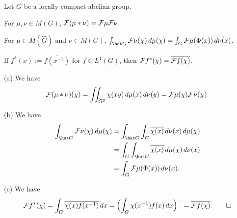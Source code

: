 \documentclass{../../small}
\begin{document}
\begin{prop}
Let $G$ be a locally compact abelian group.
\begin{parts}
\item For $\mu,\nu\in M(G)$, $\mathcal{F}(\mu*\nu)=\mathcal{F}\mu\mathcal{F}\nu$.
\item For $\mu\in M(\hat G)$ and $\nu\in M(G)$, $\int_{\hat G}\cF \nu(\chi)\,d\mu(\chi)=\int_G\cF\mu(\Phi(x))\,d\nu(x)$.
\item If $f^*(x):=\bar{f(x^{-1})}$ for $f\in L^1(G)$, then $\mathcal{F} f^*(\chi)=\overline{\mathcal{F} f(\chi)}$.
\end{parts}
\end{prop}
\begin{pf}
(a)
We have
\[\mathcal{F}(\mu*\nu)(\chi)=\iint_{G^2}\chi(xy)\,d\mu(x)\,d\nu(y)=\mathcal{F}\mu(\chi)\mathcal{F}\nu(\chi).\]

(b)
We have
\begin{align*}
\int_{\hat G}\cF \nu(\chi)\,d\mu(\chi)
&=\int_{\hat G}\int_G\bar{\chi(x)}\,d\nu(x)\,d\mu(\chi)\\
&=\int_G\int_{\hat G}\bar{\chi(x)}\,d\mu(\chi)\,d\nu(x)\\
&=\int_G\cF\mu(\Phi(x))\,d\nu(x).
\end{align*}

(c)
We have
\[\mathcal{F} f^*(\chi)=\int_G\overline{\chi(x)}\overline{f(x^{-1})}\,dx=\Bigl(\int_G\chi(x^{-1})f(x)\,dx\Bigr)^-=\overline{\mathcal{F} f(\chi)}.\qedhere\]
\end{pf}
\end{document}
